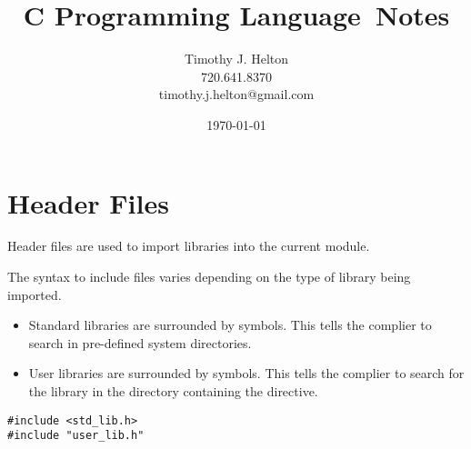 \documentclass{article}
\newcommand{\topic}{C Programming Language}
\begin{document}
\title{\topic \ Notes}
\author{Timothy J. Helton\\720.641.8370\\timothy.j.helton@gmail.com}
\date{\today}

\begin{titlingpage}
  \maketitle
\end{titlingpage}

\hypertarget{toc}{}
\tableofcontents
\newpage

\listoffigures
\listoftables
\newpage

\printnomenclature[0.75in]
\hfill

\newpage

\pagestyle{fancy}
\section{Header Files}
Header files are used to import libraries into the current module.

The syntax to include files varies depending on the type of library being
imported.
\begin{itemize}
  \item Standard libraries are surrounded by
    {\color{red}{\textless \ \textgreater}} symbols.
    This tells the complier to search in pre-defined system directories.
  \item User libraries are surrounded by {\color{red}{""}} symbols.
    This tells the complier to search for the library in the directory
    containing the directive.
\end{itemize}
\begin{lstlisting}
#include <std_lib.h>
#include "user_lib.h"
\end{lstlisting}

\newpage

%

\end{document}
